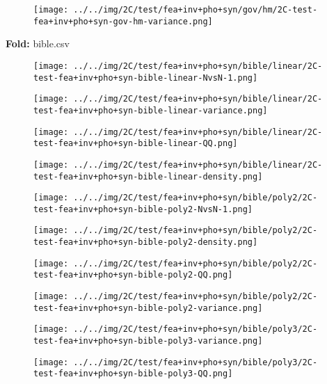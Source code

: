 \begin{figure}[H]
\centering	\texttt{[image: ../../img/2C/test/fea+inv+pho+syn/gov/hm/2C-test-fea+inv+pho+syn-gov-hm-variance.png]}
\end{figure}
\textbf{Fold:} bible.csv
\begin{figure}[H]
\centering	\texttt{[image: ../../img/2C/test/fea+inv+pho+syn/bible/linear/2C-test-fea+inv+pho+syn-bible-linear-NvsN-1.png]}
\end{figure}
\begin{figure}[H]
\centering	\texttt{[image: ../../img/2C/test/fea+inv+pho+syn/bible/linear/2C-test-fea+inv+pho+syn-bible-linear-variance.png]}
\end{figure}
\begin{figure}[H]
\centering	\texttt{[image: ../../img/2C/test/fea+inv+pho+syn/bible/linear/2C-test-fea+inv+pho+syn-bible-linear-QQ.png]}
\end{figure}
\begin{figure}[H]
\centering	\texttt{[image: ../../img/2C/test/fea+inv+pho+syn/bible/linear/2C-test-fea+inv+pho+syn-bible-linear-density.png]}
\end{figure}
\begin{figure}[H]
\centering	\texttt{[image: ../../img/2C/test/fea+inv+pho+syn/bible/poly2/2C-test-fea+inv+pho+syn-bible-poly2-NvsN-1.png]}
\end{figure}
\begin{figure}[H]
\centering	\texttt{[image: ../../img/2C/test/fea+inv+pho+syn/bible/poly2/2C-test-fea+inv+pho+syn-bible-poly2-density.png]}
\end{figure}
\begin{figure}[H]
\centering	\texttt{[image: ../../img/2C/test/fea+inv+pho+syn/bible/poly2/2C-test-fea+inv+pho+syn-bible-poly2-QQ.png]}
\end{figure}
\begin{figure}[H]
\centering	\texttt{[image: ../../img/2C/test/fea+inv+pho+syn/bible/poly2/2C-test-fea+inv+pho+syn-bible-poly2-variance.png]}
\end{figure}
\begin{figure}[H]
\centering	\texttt{[image: ../../img/2C/test/fea+inv+pho+syn/bible/poly3/2C-test-fea+inv+pho+syn-bible-poly3-variance.png]}
\end{figure}
\begin{figure}[H]
\centering	\texttt{[image: ../../img/2C/test/fea+inv+pho+syn/bible/poly3/2C-test-fea+inv+pho+syn-bible-poly3-QQ.png]}
\end{figure}
